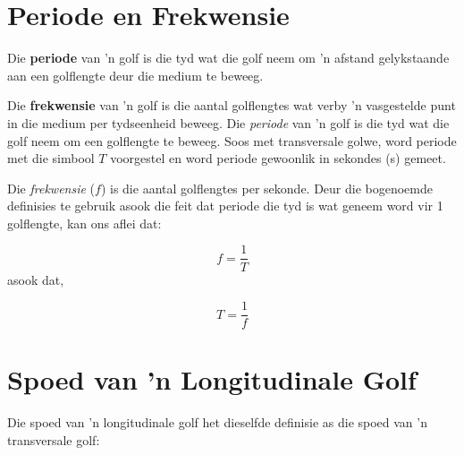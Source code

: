             \section{Periode en Frekwensie}
            \nopagebreak
            \par
{} { \label{m38782*meaningfhsst!!!underscore!!!id143}
       Die \textbf{periode} van 'n golf is die tyd wat die golf neem om 'n afstand gelykstaande aan een golflengte deur die medium te beweeg.
         } 
\par
  { \label{m38782*meaningfhsst!!!underscore!!!id146}
        Die \textbf{frekwensie} van 'n golf is die aantal golflengtes wat verby 'n vasgestelde punt in die medium per tydseenheid beweeg.
         } 
        \label{m38782*id292523} Die \textsl{periode} van 'n golf is die tyd wat die golf neem om een golflengte te beweeg. Soos met transversale golwe, word periode met die simbool $T$ voorgestel en word periode gewoonlik in sekondes (s) gemeet.\par 
        \label{m38782*id292542} Die \textsl{frekwensie} ($f$) is die aantal golflengtes per sekonde. Deur die bogenoemde definisies te gebruik asook die feit dat periode die tyd is wat geneem word vir 1 golflengte, kan ons aflei dat:\par 
        \label{m38782*id291687}\nopagebreak\noindent{}
          
    \begin{equation}
    f=\frac{1}{T}
      \end{equation}
        \label{m38782*id291706}asook dat,\par 
        \label{m38782*id292764}\nopagebreak\noindent{}
    \begin{equation}
    T=\frac{1}{f}
      \end{equation}
      \label{m38782*uid11}
            \section{Spoed van 'n Longitudinale Golf}
            \nopagebreak
            \label{m38782*id292794}Die spoed van 'n longitudinale golf het dieselfde definisie as die spoed van 'n transversale golf:\par
%           

